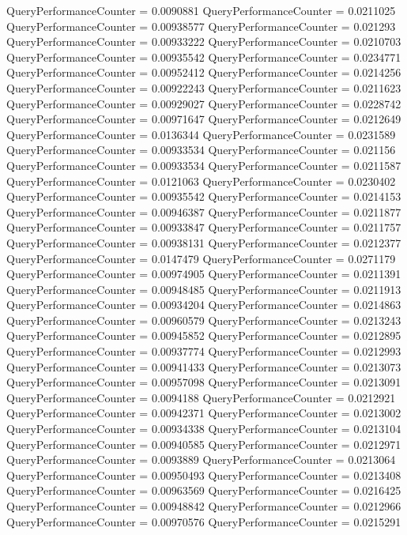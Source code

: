 \documentclass[9pt]{article}
\theoremstyle{plain}
\theoremstyle{definition}
\theoremstyle{remark}
\numberwithin{equation}{section}
\begin{document}
QueryPerformanceCounter  =  0.0090881
QueryPerformanceCounter  =  0.0211025
QueryPerformanceCounter  =  0.00938577
QueryPerformanceCounter  =  0.021293
QueryPerformanceCounter  =  0.00933222
QueryPerformanceCounter  =  0.0210703
QueryPerformanceCounter  =  0.00935542
QueryPerformanceCounter  =  0.0234771
QueryPerformanceCounter  =  0.00952412
QueryPerformanceCounter  =  0.0214256
QueryPerformanceCounter  =  0.00922243
QueryPerformanceCounter  =  0.0211623
QueryPerformanceCounter  =  0.00929027
QueryPerformanceCounter  =  0.0228742
QueryPerformanceCounter  =  0.00971647
QueryPerformanceCounter  =  0.0212649
QueryPerformanceCounter  =  0.0136344
QueryPerformanceCounter  =  0.0231589
QueryPerformanceCounter  =  0.00933534
QueryPerformanceCounter  =  0.021156
QueryPerformanceCounter  =  0.00933534
QueryPerformanceCounter  =  0.0211587
QueryPerformanceCounter  =  0.0121063
QueryPerformanceCounter  =  0.0230402
QueryPerformanceCounter  =  0.00935542
QueryPerformanceCounter  =  0.0214153
QueryPerformanceCounter  =  0.00946387
QueryPerformanceCounter  =  0.0211877
QueryPerformanceCounter  =  0.00933847
QueryPerformanceCounter  =  0.0211757
QueryPerformanceCounter  =  0.00938131
QueryPerformanceCounter  =  0.0212377
QueryPerformanceCounter  =  0.0147479
QueryPerformanceCounter  =  0.0271179
QueryPerformanceCounter  =  0.00974905
QueryPerformanceCounter  =  0.0211391
QueryPerformanceCounter  =  0.00948485
QueryPerformanceCounter  =  0.0211913
QueryPerformanceCounter  =  0.00934204
QueryPerformanceCounter  =  0.0214863
QueryPerformanceCounter  =  0.00960579
QueryPerformanceCounter  =  0.0213243
QueryPerformanceCounter  =  0.00945852
QueryPerformanceCounter  =  0.0212895
QueryPerformanceCounter  =  0.00937774
QueryPerformanceCounter  =  0.0212993
QueryPerformanceCounter  =  0.00941433
QueryPerformanceCounter  =  0.0213073
QueryPerformanceCounter  =  0.00957098
QueryPerformanceCounter  =  0.0213091
QueryPerformanceCounter  =  0.0094188
QueryPerformanceCounter  =  0.0212921
QueryPerformanceCounter  =  0.00942371
QueryPerformanceCounter  =  0.0213002
QueryPerformanceCounter  =  0.00934338
QueryPerformanceCounter  =  0.0213104
QueryPerformanceCounter  =  0.00940585
QueryPerformanceCounter  =  0.0212971
QueryPerformanceCounter  =  0.0093889
QueryPerformanceCounter  =  0.0213064
QueryPerformanceCounter  =  0.00950493
QueryPerformanceCounter  =  0.0213408
QueryPerformanceCounter  =  0.00963569
QueryPerformanceCounter  =  0.0216425
QueryPerformanceCounter  =  0.00948842
QueryPerformanceCounter  =  0.0212966
QueryPerformanceCounter  =  0.00970576
QueryPerformanceCounter  =  0.0215291
\end{document}
